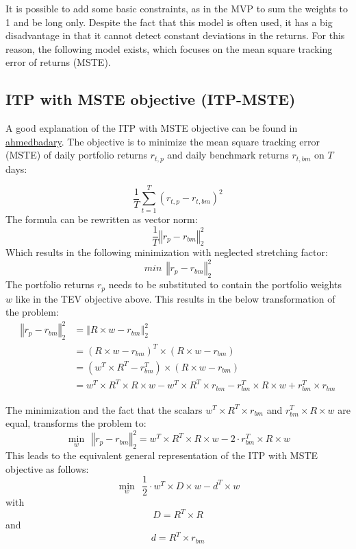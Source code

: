 \documentclass[
  oneside]{book}
\begin{document}
It is possible to add some basic constraints, as in the MVP to sum the weights to 1 and be long only. Despite the fact that this model is often used, it has a big disadvantage in that it cannot detect constant deviations in the returns. For this reason, the following model exists, which focuses on the mean square tracking error of returns (MSTE).

\hypertarget{itp-with-mste-objective-itp-mste}{%
\subsection{ITP with MSTE objective (ITP-MSTE)}\label{itp-with-mste-objective-itp-mste}}

A good explanation of the ITP with MSTE objective can be found in \href{https://ahmedbadary.github.io/work_files/research/conv_opt/hw/iftp}{ahmedbadary}. The objective is to minimize the mean square tracking error (MSTE) of daily portfolio returns \(r_{t, p}\) and daily benchmark returns \(r_{t, bm}\) on \(T\) days:

\[
  \frac{1}{T} \sum^T_{t=1}(r_{t, p}-r_{t, bm})^2
\]
The formula can be rewritten as vector norm:
\[
  \frac{1}{T} \left\Vert r_{p}-r_{bm} \right\Vert_2^2
\]
Which results in the following minimization with neglected stretching factor:
\[
 min \ \  \left\Vert r_{p}-r_{bm} \right\Vert_2^2
\]
The portfolio returns \(r_p\) needs to be substituted to contain the portfolio weights \(w\) like in the TEV objective above. This results in the below transformation of the problem:
\begin{align*}
  \left\Vert r_{p}-r_{bm} \right\Vert_2^2 &= \left\Vert R \times w-r_{bm} \right\Vert_2^2 \\ 
  &= (R \times w-r_{bm})^T \times (R \times w-r_{bm}) \\ 
  &= (w^T \times R^T-r_{bm}^T) \times (R \times w-r_{bm}) \\ 
  &= w^T \times R^T \times R \times w - w^T \times R^T \times r_{bm} - r_{bm}^T \times R \times w + r_{bm}^T \times r_{bm} 
\end{align*}

The minimization and the fact that the scalars \(w^T \times R^T \times r_{bm}\) and \(r_{bm}^T \times R \times w\) are equal, transforms the problem to:
\[
  \min\limits_{w} \ \  \left\Vert r_{p}-r_{bm} \right\Vert_2^2 
  = w^T \times R^T \times R \times w - 2\cdot r_{bm}^T \times R \times w
\]
This leads to the equivalent general representation of the ITP with MSTE objective as follows:
\[
  \min\limits_{w} \ \ \frac{1}{2} \cdot w^T \times D \times w - d^T \times w
\]
with
\[
D = R^T \times R
\]
and
\[
  d = R^T \times r_{bm}
\]
\end{document}
